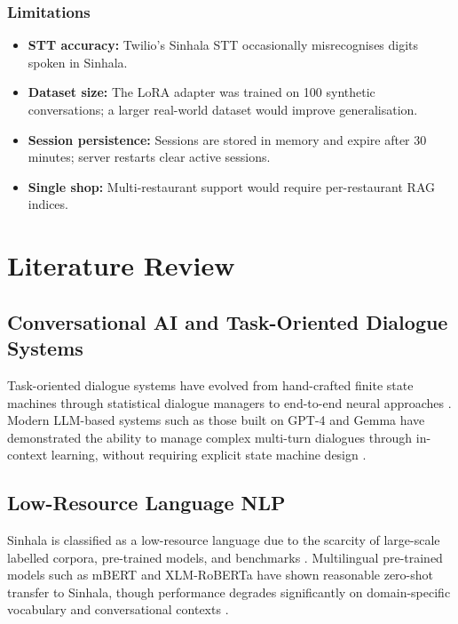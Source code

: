 \documentclass[12pt,a4paper]{report}
\begin{document}
\subsection{Limitations}
\begin{itemize}
    \item \textbf{STT accuracy:} Twilio's Sinhala STT occasionally misrecognises digits spoken in Sinhala.
    \item \textbf{Dataset size:} The LoRA adapter was trained on 100 synthetic conversations; a larger real-world dataset would improve generalisation.
    \item \textbf{Session persistence:} Sessions are stored in memory and expire after 30 minutes; server restarts clear active sessions.
    \item \textbf{Single shop:} Multi-restaurant support would require per-restaurant RAG indices.
\end{itemize}

\chapter{Literature Review}

\section{Conversational AI and Task-Oriented Dialogue Systems}
Task-oriented dialogue systems have evolved from hand-crafted finite state machines through statistical dialogue managers to end-to-end neural approaches \cite{young2013}. Modern LLM-based systems such as those built on GPT-4 and Gemma have demonstrated the ability to manage complex multi-turn dialogues through in-context learning, without requiring explicit state machine design \cite{brown2020}.

\section{Low-Resource Language NLP}
Sinhala is classified as a low-resource language due to the scarcity of large-scale labelled corpora, pre-trained models, and benchmarks \cite{joshi2020}. Multilingual pre-trained models such as mBERT and XLM-RoBERTa have shown reasonable zero-shot transfer to Sinhala, though performance degrades significantly on domain-specific vocabulary and conversational contexts \cite{conneau2020}.
\end{document}
